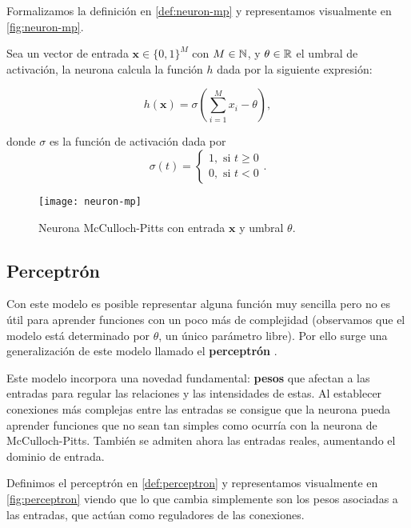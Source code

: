 Formalizamos la definición en \autoref{def:neuron-mp} y representamos visualmente en \autoref{fig:neuron-mp}.

\begin{definicion}
  Sea un vector de entrada $\textbf{x} \in \{0, 1\}^M$ con $M \in \mathbb{N}$, y $\theta \in \mathbb{R}$ el umbral de activación, la neurona calcula la función $h$ dada por la siguiente expresión:

  $$ h(\textbf{x}) = \sigma\left(\sum \limits^M_{i = 1} x_i - \theta\right),$$

  donde $\sigma$ es la función de activación dada por $$\sigma(t) = \begin{cases} 1, \text{ si } t \geq 0 \\ 0, \text{ si } t < 0 \end{cases}.$$
  \label{def:neuron-mp}
\end{definicion}

\begin{figure}[htpb]
  \centering
  \texttt{[image: neuron-mp]}
  \caption{Neurona McCulloch-Pitts con entrada $\textbf{x}$ y umbral $\theta$.}
  \label{fig:neuron-mp}
\end{figure}

\subsection{Perceptrón}

Con este modelo es posible representar alguna función muy sencilla pero no es útil para aprender funciones con un poco más de complejidad (observamos que el modelo está determinado por $\theta$, un único parámetro libre). Por ello surge una generalización de este modelo llamado el \textbf{perceptrón} \cite{rosenblatt1958perceptron}.

Este modelo incorpora una novedad fundamental: \textbf{pesos} que afectan a las entradas para regular las relaciones y las intensidades de estas. Al establecer conexiones más complejas entre las entradas se consigue que la neurona pueda aprender funciones que no sean tan simples como ocurría con la neurona de McCulloch-Pitts. También se admiten ahora las entradas reales, aumentando el dominio de entrada.

Definimos el perceptrón en \autoref{def:perceptron} y representamos visualmente en \autoref{fig:perceptron} viendo que lo que cambia simplemente son los pesos asociadas a las entradas, que actúan como reguladores de las conexiones.

